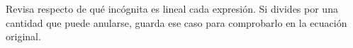 Revisa respecto de qué incógnita es lineal cada expresión. Si divides por una cantidad que puede anularse, guarda ese caso para comprobarlo en la ecuación original.
